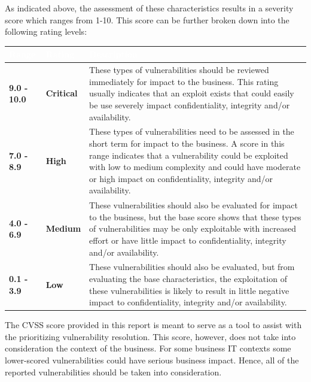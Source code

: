 \documentclass{article}
\begin{document}
            \noindent \large As indicated above, the assessment of these characteristics results in a severity score which ranges
            from 1-10. This score can be further broken down into the following rating levels: \\
            \newpage
            \begin{center}
                \begin{longtable} {|p{4.5em}|p{4.5em}|p{30em}|}
                \hline 
                \large \cellcolor{tablecol} \textcolor{white}{\textbf{Range}} & \large \cellcolor{tablecol} \textcolor{white}{\textbf{Rating}} & \large \textcolor{white}{\cellcolor{tablecol} \textbf{Description}}   \\    
                \hline
                \normalsize \textbf{9.0 - 10.0} & \normalsize \textcolor{critical}{\textbf{Critical}} & \normalsize These types of vulnerabilities should be reviewed immediately for impact to the
                business. This rating usually indicates that an exploit exists that could easily be use
                severely impact confidentiality, integrity and/or availability.  \\
                \hline
                \normalsize \textbf{7.0 - 8.9} & \normalsize \textcolor{high}{\textbf{High}} & \normalsize These types of vulnerabilities need to be assessed in the short term for impact to the
                business. A score in this range indicates that a vulnerability could be exploited with
                low to medium complexity and could have moderate or high impact on confidentiality,
                integrity and/or availability.  \\
                \hline
                \normalsize \textbf{4.0 - 6.9} & \normalsize \textcolor{medium}{\textbf{Medium}} & \normalsize These vulnerabilities should also be evaluated for impact to the business, but the
                base score shows that these types of vulnerabilities may be only exploitable with
                increased effort or have little impact to confidentiality, integrity and/or availability.  \\
                \hline
                \normalsize \textbf{0.1 - 3.9}  & \normalsize \textcolor{low}{\textbf{Low}} & \normalsize These vulnerabilities should also be evaluated, but from evaluating the base
                characteristics, the exploitation of these vulnerabilities is likely to result in little
                negative impact to confidentiality, integrity and/or availability.  \\
                \hline
                \end{longtable}   
            \end{center}
            \large The CVSS score provided in this report is meant to serve as a tool to assist with the prioritizing
            vulnerability resolution. This score, however, does not take into consideration the context of the
            business. For some business IT contexts some lower-scored vulnerabilities could have serious
            business impact. Hence, all of the reported vulnerabilities should be taken into consideration.
\end{document}

